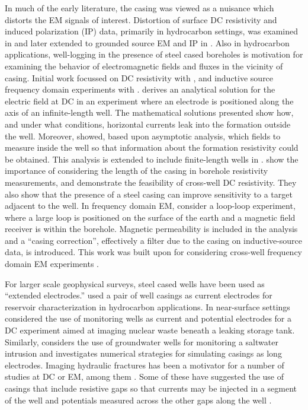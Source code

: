 In much of the early literature, the casing was viewed as a nuisance which distorts the EM signals of interest. Distortion of surface DC resistivity and induced polarization (IP) data, primarily in hydrocarbon settings, was examined in \cite{Wait1983, Holladay1984, Johnston1987} and later extended to grounded source EM and IP in \cite{Wait1985, Williams1985, Johnston1992}. Also in hydrocarbon applications, well-logging in the presence of steel cased boreholes is motivation for examining the behavior of electromagnetic fields and fluxes in the vicinity of casing. Initial work focussed on DC resistivity with \cite{Kaufman1990, Schenkel1990, Kaufman1993, Schenkel1994}, and inductive source frequency domain experiments with \cite{Augustin1989}. \cite{Kaufman1990} derives an analytical solution for the electric field at DC in an experiment where an electrode is positioned along the axis of an infinite-length well. The mathematical solutions presented show how, and under what conditions, horizontal currents leak into the formation outside the well. Moreover, \cite{Kaufman1990} showed, based upon asymptotic analysis, which fields to measure inside the well so that information about the formation resistivity could be obtained. This analysis is extended to include finite-length wells in \cite{Kaufman1993}. \cite{Schenkel1994} show the importance of considering the length of the casing in borehole resistivity measurements, and demonstrate the feasibility of cross-well DC resistivity. They also show that the presence of a steel casing can improve sensitivity to a target adjacent to the well. In frequency domain EM, \cite{Augustin1989} consider a loop-loop experiment, where a large loop is positioned on the surface of the earth and a magnetic field receiver is within the borehole. Magnetic permeability is included in the analysis and a ``casing correction'', effectively a filter due to the casing on inductive-source data, is introduced. This work was built upon for considering cross-well frequency domain EM experiments \citep{Uchida1991, Wilt1996}.

For larger scale geophysical surveys, steel cased wells have been used as ``extended electrodes.'' \cite{Rocroi1985} used a pair of well casings as current electrodes for reservoir characterization in hydrocarbon applications. In near-surface settings \cite{Ramirez1996, Rucker2010, Rucker2012} considered the use of monitoring wells as current and potential electrodes for a DC experiment aimed at imaging nuclear waste beneath a leaking storage tank. Similarly, \cite{Ronczka2015} considers the use of groundwater wells for monitoring a saltwater intrusion and investigates numerical strategies for simulating casings as long electrodes. Imaging hydraulic fractures has been a motivator for a number of studies at DC or EM, among them \cite{Weiss2016, hoversten2017borehole}. Some of these have suggested the use of casings that include resistive gaps so that currents may be injected in a segment of the well and potentials measured across the other gaps along the well \citep{Nekut1995, Zhang2018}.

